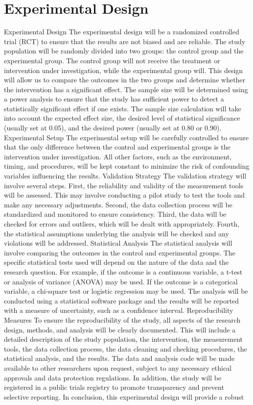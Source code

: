 \documentclass[conference]{IEEEtran}
\begin{document}
\section{Experimental Design}
Experimental Design The experimental design will be a randomized controlled trial (RCT) to ensure that the results are not biased and are reliable. The study population will be randomly divided into two groups: the control group and the experimental group. The control group will not receive the treatment or intervention under investigation, while the experimental group will. This design will allow us to compare the outcomes in the two groups and determine whether the intervention has a significant effect. The sample size will be determined using a power analysis to ensure that the study has sufficient power to detect a statistically significant effect if one exists. The sample size calculation will take into account the expected effect size, the desired level of statistical significance (usually set at 0.05), and the desired power (usually set at 0.80 or 0.90). Experimental Setup The experimental setup will be carefully controlled to ensure that the only difference between the control and experimental groups is the intervention under investigation. All other factors, such as the environment, timing, and procedures, will be kept constant to minimize the risk of confounding variables influencing the results. Validation Strategy The validation strategy will involve several steps. First, the reliability and validity of the measurement tools will be assessed. This may involve conducting a pilot study to test the tools and make any necessary adjustments. Second, the data collection process will be standardized and monitored to ensure consistency. Third, the data will be checked for errors and outliers, which will be dealt with appropriately. Fourth, the statistical assumptions underlying the analysis will be checked and any violations will be addressed. Statistical Analysis The statistical analysis will involve comparing the outcomes in the control and experimental groups. The specific statistical tests used will depend on the nature of the data and the research question. For example, if the outcome is a continuous variable, a t-test or analysis of variance (ANOVA) may be used. If the outcome is a categorical variable, a chi-square test or logistic regression may be used. The analysis will be conducted using a statistical software package and the results will be reported with a measure of uncertainty, such as a confidence interval. Reproducibility Measures To ensure the reproducibility of the study, all aspects of the research design, methods, and analysis will be clearly documented. This will include a detailed description of the study population, the intervention, the measurement tools, the data collection process, the data cleaning and checking procedures, the statistical analysis, and the results. The data and analysis code will be made available to other researchers upon request, subject to any necessary ethical approvals and data protection regulations. In addition, the study will be registered in a public trials registry to promote transparency and prevent selective reporting. In conclusion, this experimental design will provide a robust 
\end{document}
